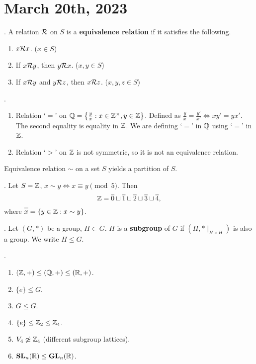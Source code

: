 \section*{March 20th, 2023}

.  A relation \(\mathcal{R}\) on \(S\) is a \textbf{equivalence relation} if it satisfies the following.
\begin{enumerate}
    \item {} \(x \mathcal{R} x\). (\(x \in S\))
    \item {} If \(x \mathcal{R} y\), then \(y \mathcal{R} x\). (\(x, y \in S\))
    \item {} If \(x \mathcal{R} y\) and \(y \mathcal{R} z\), then \(x \mathcal{R} z\). (\(x, y, z \in S\))
\end{enumerate}

\ex.
\begin{enumerate}
    \item Relation `\(=\)' on \(\mathbb{Q} = \left\{\frac{y}{x} : x \in \mathbb{Z}^\times, y \in \mathbb{Z}\right\}\). Defined as \(\frac{y}{x} = \frac{y'}{x'} \iff xy' = yx'\). The second equality is equality in \(\mathbb{Z}\). We are defining `\(=\)' in \(\mathbb{Q}\) using `\(=\)' in \(\mathbb{Z}\).
    \item Relation `\(>\)' on \(\mathbb{Z}\) is not symmetric, so it is not an equivalence relation.
\end{enumerate}

 Equivalence relation \(\sim\) on a set \(S\) yields a partition of \(S\).

\ex. Let \(S = \mathbb{Z}\), \(x \sim y \iff x \equiv y \pmod 5\). Then
\[
    \Z = \bar{0} \sqcup \bar{1} \sqcup \bar{2} \sqcup \bar{3} \sqcup \bar{4},
\]
where \(\bar{x} = \{y \in \Z : x \sim y\}\).


.  Let \((G, *)\) be a group, \(H \subset G\). \(H\) is a \textbf{subgroup} of \(G\) if \((H, * \mid_{H\times H})\) is also a group. We write \(H \leq G\).

\ex.
\begin{enumerate}
    \item \((\mathbb{Z}, +) \leq (\mathbb{Q}, +) \leq (\mathbb{R}, +)\).
    \item {} \(\{e\} \leq G\).
    \item {} \(G \leq G\).
    \item \(\{e\} \leq \mathbb{Z}_2 \leq \mathbb{Z}_4\).
    \item \(V_4 \not\simeq \mathbb{Z}_4\) (different subgroup lattices).
    \item \(\mathbf{SL}_n(\mathbb{R}) \leq \mathbf{GL}_n(\mathbb{R})\).
\end{enumerate}

